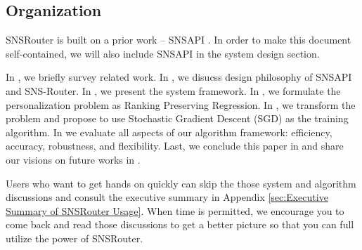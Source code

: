 \documentclass{sig-alternate}
\begin{document}
\subsection{Organization}
\label{sec:Organization}

SNSRouter \cite{github_snsapi} is built on a prior work -- SNSAPI \cite{github_snsapi}.
In order to make this document self-contained, 
we will also include SNSAPI in the system design section. 

In 
\rsec{\ref{sec:Related Work}}
, we briefly survey related work. 
In 
\rsec{\ref{sec:Philosophy}}
, we disucss design philosophy of SNSAPI and SNS-Router. 
In 
\rsec{\ref{sec:System Framework}}
, we present the system framework. 
In 
\rsec{\ref{sec:Formulation}}
, we formulate the personalization problem as Ranking Preserving Regression. 
In
\rsec{\ref{sec:Algorithm Design}}
, we transform the problem and propose to use 
Stochastic Gradient Descent (SGD) as the training algorithm. 
In 
\rsec{\ref{sec:Evaluation}}
we evaluate all aspects of our algorithm framework:
efficiency, accuracy, robustness, and flexibility. 
Last, we conclude this paper in 
\rsec{\ref{sec:Conclusion}}
and share our visions on future works in 
\rsec{\ref{sec:Future Work}}
.

Users who want to get hands on quickly can skip the those 
system and algorithm discussions and 
consult the executive summary in Appendix \ref{sec:Executive Summary of SNSRouter Usage}. 
When time is permitted, we encourage you to come back 
and read those discussions to get a better picture 
so that you can full utilize the power of SNSRouter. 

\end{document}
